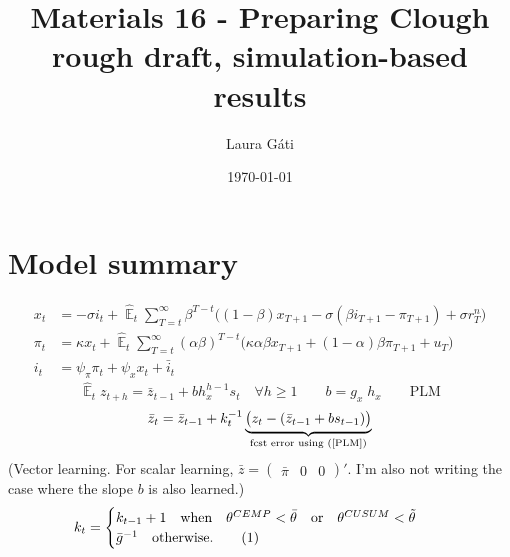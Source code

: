 \documentclass[11pt]{article}
\renewcommand{\[}{\begin{equation}}
\renewcommand{\]}{\end{equation}}
\DeclareMathOperator{\E}{\mathbb{E}}
\newcommand\numberthis{\addtocounter{equation}{1}\tag{\theequation}} %
\begin{document}
\linespread{1.0}

\title{Materials 16 - Preparing Clough rough draft, simulation-based results}
\author{Laura G\'ati} 
\date{\today}
\maketitle


\tableofcontents


\newpage
\section{Model summary}
\begin{align}
x_t &=  -\sigma i_t +\hat{\E}_t \sum_{T=t}^{\infty} \beta^{T-t }\big( (1-\beta)x_{T+1} - \sigma(\beta i_{T+1} - \pi_{T+1}) +\sigma r_T^n \big)  \label{prestons18}  \\
\pi_t &= \kappa x_t +\hat{\E}_t \sum_{T=t}^{\infty} (\alpha\beta)^{T-t }\big( \kappa \alpha \beta x_{T+1} + (1-\alpha)\beta \pi_{T+1} + u_T\big) \label{prestons19}  \\
i_t &= \psi_{\pi}\pi_t + \psi_{x} x_t  + \bar{i}_t \label{TR}
\end{align}
\begin{equation}
\hat{\E}_t z_{t+h} =  \bar{z}_{t-1} + bh_x^{h-1}s_t  \quad \forall h\geq 1 \quad \quad b = g_x\; h_x \quad \quad \text{PLM} \label{PLM}
\end{equation}
\begin{equation}
\bar{z}_{t} = \bar{z}_{t-1} +k_t^{-1}\underbrace{\big(z_{t} -(\bar{z}_{t-1}+bs_{t-1}) \big)}_{\text{fcst error using (\ref{PLM})} } 
\end{equation}
(Vector learning. For scalar learning, $\bar{z}= \begin{pmatrix} \bar{\pi} & 0 & 0\end{pmatrix}' $. I'm also not writing the case where the slope $b$ is also learned.)
 \begin{align*}
k_t & = \begin{cases} k_{t-1}+1 \quad \text{when} \quad \theta^{CEMP} < \bar{\theta} \quad \text{or}  \quad  \theta^{CUSUM} < \tilde{\theta}  \\ \bar{g}^{-1}  \quad \text{otherwise.}\numberthis
\end{cases} 
\end{align*}
\end{document}
